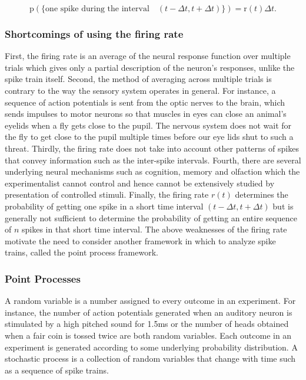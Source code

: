 \[ 
\displaystyle  \text{p}(\{ \text{one spike during the interval} \quad  (t-\Delta t, t+\Delta t)  \}) = \text{r}(t)\Delta t. 
\]

\subsubsection{Shortcomings of using the firing rate}
First, the firing rate is an average of the neural response function over
multiple trials which gives only a partial description of the neuron's responses,
unlike the spike train itself.
Second, the method of averaging across multiple trials is contrary to the way
the sensory system operates in general.
For instance, a sequence of action potentials is sent from the optic nerves
to the brain, which sends impulses to motor neurons so that muscles in eyes can close an animal's eyelids when a fly gets close to the pupil.
The nervous system does not wait for the fly to get close to the pupil multiple
times before our eye lids shut to such a threat.
Thirdly, the firing rate does not take into account other patterns of spikes
that convey information such as the inter-spike intervals.
Fourth, there are several underlying neural mechanisms such as cognition, memory
and olfaction which the experimentalist cannot control and hence cannot be extensively studied by presentation of controlled stimuli.
Finally, the firing rate $r(t)$ determines the probability of getting one spike
in a short time interval $(t-\Delta t, t+\Delta t)$ but is generally not sufficient to determine the probability of getting an entire sequence of $n$ spikes in that short time interval.
The above weaknesses of the firing rate motivate the  need to consider another framework in which to analyze spike trains, called the point process framework.


\subsubsection{Point Processes}
A random variable is a number assigned to every outcome in an experiment.
For instance, the number of action potentials generated when an auditory neuron is stimulated by a high pitched sound for 1.5ms or the number of heads obtained when a fair coin is tossed twice are both random variables.  Each outcome in an experiment is generated according to some underlying probability distribution. A stochastic process is a collection  of random variables that change with time such as a sequence of spike trains.\\

